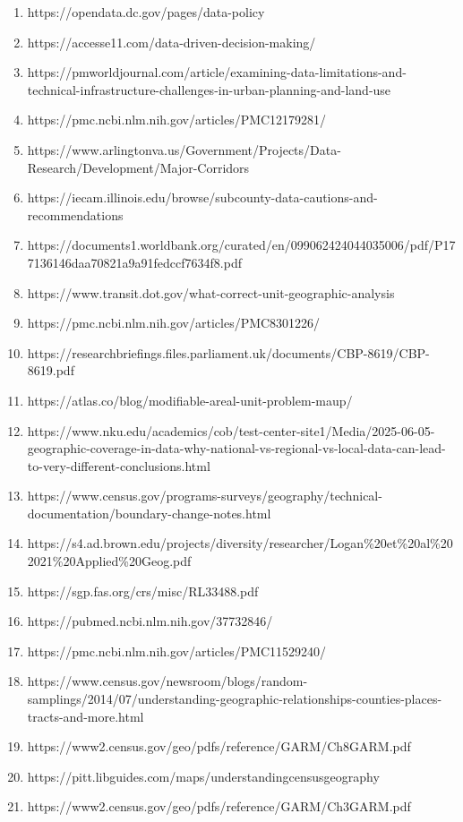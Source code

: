 \documentclass[
  letterpaper,
  DIV=11,
  numbers=noendperiod]{scrartcl}
\begin{document}
\begin{enumerate}
\item
  https://opendata.dc.gov/pages/data-policy
\item
  https://accesse11.com/data-driven-decision-making/
\item
  https://pmworldjournal.com/article/examining-data-limitations-and-technical-infrastructure-challenges-in-urban-planning-and-land-use
\item
  https://pmc.ncbi.nlm.nih.gov/articles/PMC12179281/
\item
  https://www.arlingtonva.us/Government/Projects/Data-Research/Development/Major-Corridors
\item
  https://iecam.illinois.edu/browse/subcounty-data-cautions-and-recommendations
\item
  https://documents1.worldbank.org/curated/en/099062424044035006/pdf/P177136146daa70821a9a91fedccf7634f8.pdf
\item
  https://www.transit.dot.gov/what-correct-unit-geographic-analysis
\item
  https://pmc.ncbi.nlm.nih.gov/articles/PMC8301226/
\item
  https://researchbriefings.files.parliament.uk/documents/CBP-8619/CBP-8619.pdf
\item
  https://atlas.co/blog/modifiable-areal-unit-problem-maup/
\item
  https://www.nku.edu/academics/cob/test-center-site1/Media/2025-06-05-geographic-coverage-in-data-why-national-vs-regional-vs-local-data-can-lead-to-very-different-conclusions.html
\item
  https://www.census.gov/programs-surveys/geography/technical-documentation/boundary-change-notes.html
\item
  https://s4.ad.brown.edu/projects/diversity/researcher/Logan\%20et\%20al\%202021\%20Applied\%20Geog.pdf
\item
  https://sgp.fas.org/crs/misc/RL33488.pdf
\item
  https://pubmed.ncbi.nlm.nih.gov/37732846/
\item
  https://pmc.ncbi.nlm.nih.gov/articles/PMC11529240/
\item
  https://www.census.gov/newsroom/blogs/random-samplings/2014/07/understanding-geographic-relationships-counties-places-tracts-and-more.html
\item
  https://www2.census.gov/geo/pdfs/reference/GARM/Ch8GARM.pdf
\item
  https://pitt.libguides.com/maps/understandingcensusgeography
\item
  https://www2.census.gov/geo/pdfs/reference/GARM/Ch3GARM.pdf

\end{enumerate}
\end{document}
